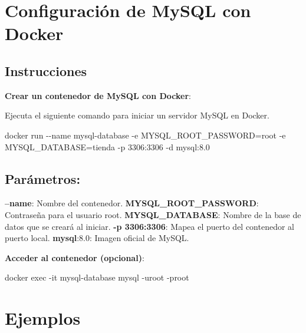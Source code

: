 \documentclass[
  a4paper,
  DIV=11,
  numbers=noendperiod,
  onepage,
  openany]{scrreprt}
\newenvironment{Shaded}{\begin{snugshade}}{\end{snugshade}}
\newcommand{\AttributeTok}[1]{\textcolor[rgb]{0.40,0.45,0.13}{#1}}
\newcommand{\ExtensionTok}[1]{\textcolor[rgb]{0.00,0.23,0.31}{#1}}
\newcommand{\NormalTok}[1]{\textcolor[rgb]{0.00,0.23,0.31}{#1}}
\begin{document}
\section{Configuración de MySQL con
Docker}\label{configuraciuxf3n-de-mysql-con-docker}

\subsection{Instrucciones}\label{instrucciones-6}

\textbf{Crear un contenedor de MySQL con Docker}:

Ejecuta el siguiente comando para iniciar un servidor MySQL en Docker.

\begin{Shaded}
\begin{Highlighting}[]
\ExtensionTok{docker}\NormalTok{ run }\AttributeTok{{-}{-}name}\NormalTok{ mysql{-}database }\AttributeTok{{-}e}\NormalTok{ MYSQL\_ROOT\_PASSWORD=root }\AttributeTok{{-}e}\NormalTok{ MYSQL\_DATABASE=tienda }\AttributeTok{{-}p}\NormalTok{ 3306:3306 }\AttributeTok{{-}d}\NormalTok{ mysql:8.0}
\end{Highlighting}
\end{Shaded}

\subsection{Parámetros:}\label{paruxe1metros}

\textbf{--name}: Nombre del contenedor. \textbf{MYSQL\_ROOT\_PASSWORD}:
Contraseña para el usuario root. \textbf{MYSQL\_DATABASE}: Nombre de la
base de datos que se creará al iniciar. \textbf{-p 3306:3306}: Mapea el
puerto del contenedor al puerto local. \textbf{mysql}:8.0: Imagen
oficial de MySQL.

\textbf{Acceder al contenedor (opcional)}:

\begin{Shaded}
\begin{Highlighting}[]
\ExtensionTok{docker}\NormalTok{ exec }\AttributeTok{{-}it}\NormalTok{ mysql{-}database mysql }\AttributeTok{{-}uroot} \AttributeTok{{-}proot}
\end{Highlighting}
\end{Shaded}

\section{Ejemplos}\label{ejemplos-5}
\end{document}
